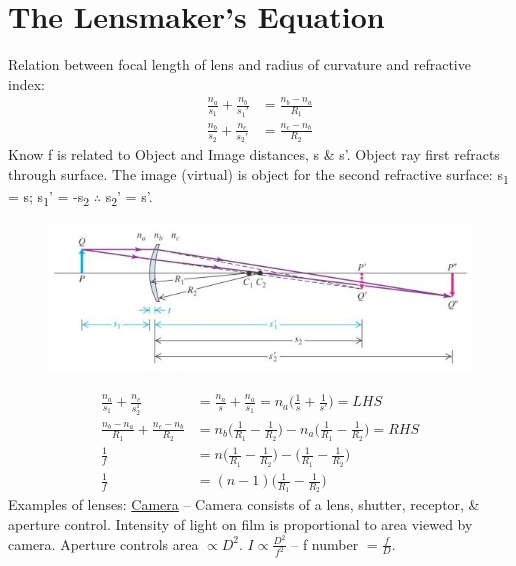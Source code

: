 \documentclass[a4paper, 11pt, normalem]{report}
\begin{document}
\section{The Lensmaker's Equation}
Relation between focal length of lens and radius of curvature and refractive index:
\begin{align}
    \frac{n_{a}}{s_{1}} + \frac{n_{b}}{s_{1}'} &= \frac{n_{b} - n_{a}}{R_{1}}\\
    \frac{n_{b}}{s_{2}} + \frac{n_{c}}{s_{2}'} &= \frac{n_{c} - n_{b}}{R_{2}}
\end{align}
Know f is related to Object and Image distances, s \& s'.
Object ray first refracts through surface.
The image (virtual) is object for the second refractive surface: s\textsubscript{1} = s; s\textsubscript{1}' = -s\textsubscript{2} $\therefore$ s\textsubscript{2}' = s'.
\begin{figure}[H]
    \centering
    \includegraphics{Lensmaker.jpg}
\end{figure}
\begin{align}
    \frac{n_{a}}{s_{1}} + \frac{n_{c}}{s_{2}^{1}} &= \frac{n_{a}}{s} + \frac{n_{a}}{s_{1}} = n_{a}\Big(\frac{1}{s} + \frac{1}{s'}\Big) = LHS \\
    \frac{n_{b} - n_{a}}{R_{1}} + \frac{n_{c} - n_{b}}{R_{2}} &= n_{b}\Big(\frac{1}{R_{1}} - \frac{1}{R_{2}}\Big) - n_{a}\Big(\frac{1}{R_{1}} - \frac{1}{R_{2}}\Big) = RHS \\
    \frac{1}{f} &= n\Big(\frac{1}{R_{1}} - \frac{1}{R_{2}}\Big) - \Big(\frac{1}{R_{1}} - \frac{1}{R_{2}}\Big) \\
    \frac{1}{f} &= (n - 1)\Big(\frac{1}{R_{1}} - \frac{1}{R_{2}}\Big)
\end{align}
Examples of lenses: \underline{Camera} --
Camera consists of a lens, shutter, receptor, \& aperture control.
Intensity of light on film is proportional to area viewed by camera.
Aperture controls area $\propto D^{2}$.
$I \propto \frac{D^{2}}{f^{2}}$ -- f number $= \frac{f}{D}$.
\end{document}
